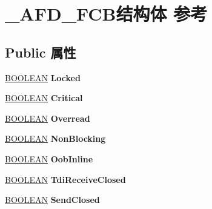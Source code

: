 \hypertarget{struct___a_f_d___f_c_b}{}\section{\+\_\+\+A\+F\+D\+\_\+\+F\+C\+B结构体 参考}
\label{struct___a_f_d___f_c_b}
\subsection*{Public 属性}
\begin{DoxyCompactItemize}
\item 
\mbox{\label{struct___a_f_d___f_c_b_aeed6b07ae071b80bdec3bc13f49a124c}} 
\hyperlink{_processor_bind_8h_a112e3146cb38b6ee95e64d85842e380a}{B\+O\+O\+L\+E\+AN} {\bfseries Locked}
\item 
\mbox{\label{struct___a_f_d___f_c_b_aa9a317a71a7aaa9ea5e3da706941c78b}} 
\hyperlink{_processor_bind_8h_a112e3146cb38b6ee95e64d85842e380a}{B\+O\+O\+L\+E\+AN} {\bfseries Critical}
\item 
\mbox{\label{struct___a_f_d___f_c_b_a839a13c1ee49942904b40ab5d7e18ff8}} 
\hyperlink{_processor_bind_8h_a112e3146cb38b6ee95e64d85842e380a}{B\+O\+O\+L\+E\+AN} {\bfseries Overread}
\item 
\mbox{\label{struct___a_f_d___f_c_b_afc2b50d865a4f833e6e982e720a8aca2}} 
\hyperlink{_processor_bind_8h_a112e3146cb38b6ee95e64d85842e380a}{B\+O\+O\+L\+E\+AN} {\bfseries Non\+Blocking}
\item 
\mbox{\label{struct___a_f_d___f_c_b_ac062570476fa97bc5f1cfd1a10854193}} 
\hyperlink{_processor_bind_8h_a112e3146cb38b6ee95e64d85842e380a}{B\+O\+O\+L\+E\+AN} {\bfseries Oob\+Inline}
\item 
\mbox{\label{struct___a_f_d___f_c_b_a602c0b5d499e038881a99144c48a4127}} 
\hyperlink{_processor_bind_8h_a112e3146cb38b6ee95e64d85842e380a}{B\+O\+O\+L\+E\+AN} {\bfseries Tdi\+Receive\+Closed}
\item 
\mbox{\label{struct___a_f_d___f_c_b_af65fce373c60b10384c2c6d6a0fb8e16}} 
\hyperlink{_processor_bind_8h_a112e3146cb38b6ee95e64d85842e380a}{B\+O\+O\+L\+E\+AN} {\bfseries Send\+Closed}

\end{DoxyCompactItemize}
